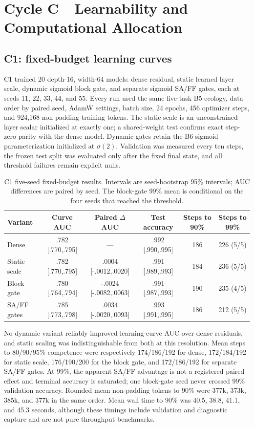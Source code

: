 \documentclass[10pt]{article}
\begin{document}
\section{Cycle C---Learnability and Computational Allocation}
\subsection{C1: fixed-budget learning curves}
C1 trained 20 depth-16, width-64 models: dense residual, static learned layer scale, dynamic sigmoid block gate, and separate sigmoid SA/FF gates, each at seeds 11, 22, 33, 44, and 55. Every run used the same five-task B5 ecology, data order by paired seed, AdamW settings, batch size, 24 epochs, 456 optimizer steps, and 924,168 non-padding training tokens. The static scale is an unconstrained layer scalar initialized at exactly one; a shared-weight test confirms exact step-zero parity with the dense model. Dynamic gates retain the B6 sigmoid parameterization initialized at $\sigma(2)$. Validation was measured every ten steps, the frozen test split was evaluated only after the fixed final state, and all threshold failures remain explicit nulls.

\begin{table}[ht]
\centering
\small
\begin{tabular}{lccccc}
\toprule
Variant & Curve AUC & Paired $\Delta$ AUC & Test accuracy & Steps to 90\% & Steps to 99\% \\
\midrule
Dense & .782 [.770,.795] & --- & .992 [.990,.995] & 186 & 226 (5/5) \\
Static scale & .782 [.770,.795] & .0004 [-.0012,.0020] & .991 [.989,.993] & 184 & 236 (5/5) \\
Block gate & .780 [.764,.794] & -.0024 [-.0082,.0063] & .991 [.987,.993] & 190 & 235 (4/5) \\
SA/FF gates & .785 [.773,.798] & .0034 [-.0020,.0093] & .993 [.991,.995] & 186 & 212 (5/5) \\
\bottomrule
\end{tabular}
\caption{C1 five-seed fixed-budget results. Intervals are seed-bootstrap 95\% intervals; AUC differences are paired by seed. The block-gate 99\% mean is conditional on the four seeds that reached the threshold.}
\end{table}

No dynamic variant reliably improved learning-curve AUC over dense residuals, and static scaling was indistinguishable from both at this resolution. Mean steps to 80/90/95\% competence were respectively 174/186/192 for dense, 172/184/192 for static scale, 176/190/200 for the block gate, and 172/186/192 for separate SA/FF gates. At 99\%, the apparent SA/FF advantage is not a registered paired effect and terminal accuracy is saturated; one block-gate seed never crossed 99\% validation accuracy. Rounded mean non-padding tokens to 90\% were 377k, 373k, 385k, and 377k in the same order. Mean wall time to 90\% was 40.5, 38.8, 41.1, and 45.3 seconds, although these timings include validation and diagnostic capture and are not pure throughput benchmarks.
\end{document}
